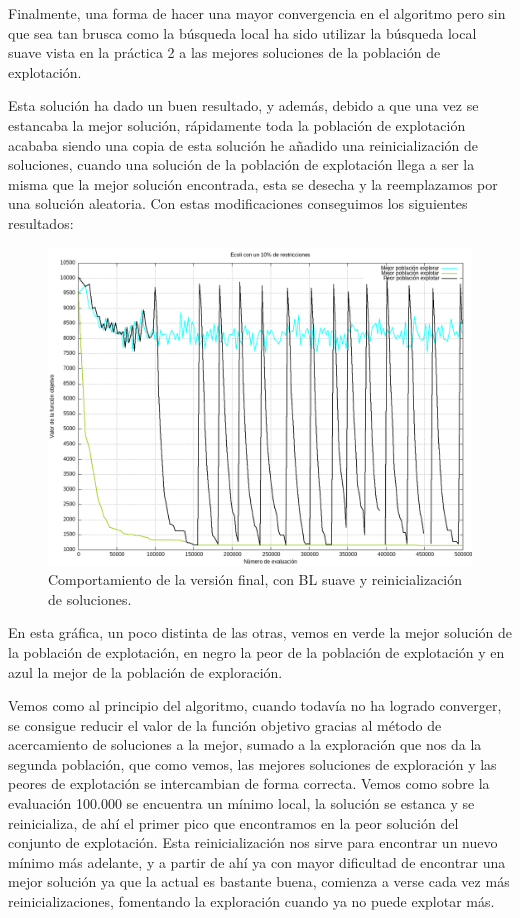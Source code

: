 \documentclass[12pt, spanish]{article}
\begin{document}
Finalmente, una forma de hacer una mayor convergencia en el algoritmo pero sin que sea tan brusca como la búsqueda local ha sido utilizar la búsqueda local suave vista en la práctica 2 a las mejores soluciones de la población de explotación.

Esta solución ha dado un buen resultado, y además, debido a que una vez se estancaba la mejor solución, rápidamente toda la población de explotación acababa siendo una copia de esta solución he añadido una reinicialización de soluciones, cuando una solución de la población de explotación llega a ser la misma que la mejor solución encontrada, esta se desecha y la reemplazamos por una solución aleatoria. Con estas modificaciones conseguimos los siguientes resultados:


\begin{figure}[H]
	\centering
	\includegraphics[scale = 0.50]{final_ecoli.png}
	
	\caption{Comportamiento de la versión final, con BL suave y reinicialización de soluciones.}
	\label{fig:final_ecoli}
\end{figure}

En esta gráfica, un poco distinta de las otras, vemos en verde la mejor solución de la población de explotación, en negro la peor de la población de explotación y en azul la mejor de la población de exploración.

Vemos como al principio del algoritmo, cuando todavía no ha logrado converger, se consigue reducir el valor de la función objetivo gracias al método de acercamiento de soluciones a la mejor, sumado a la exploración que nos da la segunda población, que como vemos, las mejores soluciones de exploración y las peores de explotación se intercambian de forma correcta. Vemos como sobre la evaluación 100.000 se encuentra un mínimo local, la solución se estanca y se reinicializa, de ahí el primer pico que encontramos en la peor solución del conjunto de explotación. Esta reinicialización nos sirve para encontrar un nuevo mínimo más adelante, y a partir de ahí ya con mayor dificultad de encontrar una mejor solución ya que la actual es bastante buena, comienza a verse cada vez más reinicializaciones, fomentando la exploración cuando ya no puede explotar más.
\end{document}
